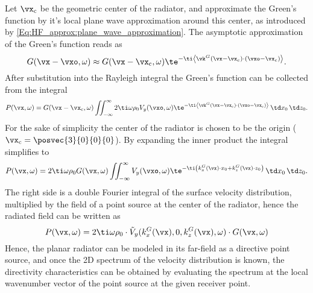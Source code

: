 Let $\vx_{\mathrm{c}}$ be the geometric center of the radiator, and approximate the Green's function by it's local plane wave approximation around this center, as introduced by \eqref{Eq:HF_approx:plane_wave_approximation}. 
The asymptotic approximation of the Green's function reads as
\begin{equation}
G(\vx-\vxo,\omega ) \approx G(\vx - \vx_{\mathrm{c}},\omega) \te^{-\ti  \left< \vk^G(\vx-\vx_{\mathrm{c}}) \cdot \left( \vxo - \vx_{\mathrm{c}} \right) \right>}.
\end{equation}
After substitution into the Rayleigh integral the Green's function can be collected from the integral
\begin{equation}
P(\vx,\omega) = G(\vx - \vx_{\mathrm{c}},\omega) \iint_{-\infty}^{\infty} 2 \ti \omega \rho_0 V_y(\vxo,\omega) \te^{-\ti  \left< \vk^G(\vx-\vx_{\mathrm{c}}) \cdot \left( \vxo - \vx_{\mathrm{c}} \right) \right>} \, \td x_0 \, \td z_0.
\end{equation}
For the sake of simplicity the center of the radiator is chosen to be the origin ($\vx_{\mathrm{c}} = \posvec{3}{0}{0}{0}$).
By expanding the inner product the integral simplifies to
\begin{equation}
P(\vx,\omega) = 2 \ti \omega \rho_0 G(\vx ,\omega) 
\iint_{-\infty}^{\infty} V_{y}(\vxo,\omega) \te^{-\ti \left( k_x^G(\vx) \cdot x_0 + k_z^G(\vx) \cdot z_0 \right)} \, \td x_0 \, \td z_0.
\end{equation}
The right side is a double Fourier integral of the surface velocity distribution, multiplied by the field of a point source at the center of the radiator, hence the radiated field can be written as
\begin{equation}
P(\vx,\omega) = 2 \ti \omega \rho_0 \cdot \tilde{V}_{y}(k_x^G(\vx),0,k_z^G(\vx),\omega) \cdot G(\vx,\omega) 
\end{equation}
Hence, the planar radiator can be modeled in its far-field as a directive point source, and once the 2D spectrum of the velocity distribution is known, the directivity characteristics can be obtained by evaluating the spectrum at the local wavenumber vector of the point source at the given receiver point.

